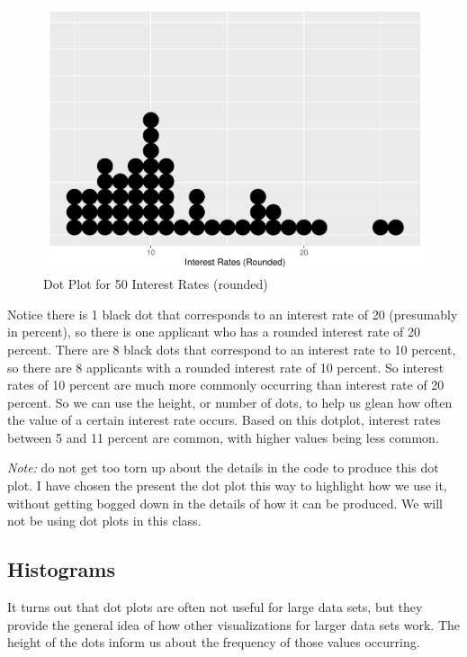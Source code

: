 \documentclass[
]{book}
\begin{document}
\begin{figure}
\centering
\includegraphics{bookdown-demo_files/figure-latex/dotplot-1.pdf}
\caption{\label{fig:dotplot}Dot Plot for 50 Interest Rates (rounded)}
\end{figure}

Notice there is 1 black dot that corresponds to an interest rate of 20 (presumably in percent), so there is one applicant who has a rounded interest rate of 20 percent. There are 8 black dots that correspond to an interest rate to 10 percent, so there are 8 applicants with a rounded interest rate of 10 percent. So interest rates of 10 percent are much more commonly occurring than interest rate of 20 percent. So we can use the height, or number of dots, to help us glean how often the value of a certain interest rate occurs. Based on this dotplot, interest rates between 5 and 11 percent are common, with higher values being less common.

\emph{Note:} do not get too torn up about the details in the code to produce this dot plot. I have chosen the present the dot plot this way to highlight how we use it, without getting bogged down in the details of how it can be produced. We will not be using dot plots in this class.

\subsection{Histograms}\label{histograms}

It turns out that dot plots are often not useful for large data sets, but they provide the general idea of how other visualizations for larger data sets work. The height of the dots inform us about the frequency of those values occurring.
\end{document}
